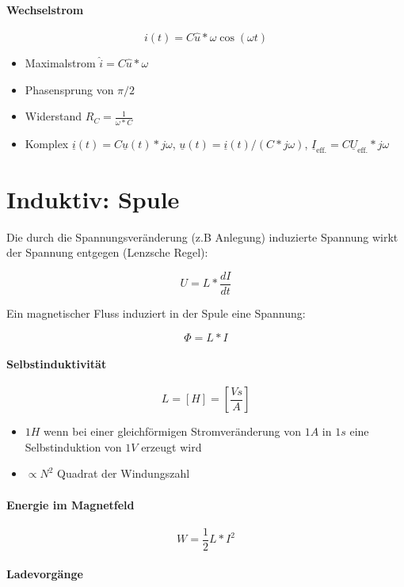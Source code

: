 \paragraph{Wechselstrom}

$$i(t) = C \hat{u} * \omega \cos (\omega t)$$

\begin{itemize}
  \item Maximalstrom $\hat{i} = C \hat{u} * \omega$
  \item Phasensprung von $\pi/2$
  \item Widerstand $R_C = \frac{1}{\omega * C}$
  \item Komplex $\underline{i}(t) = C \underline{u}(t) * j\omega$, $\underline{u}(t) = \underline{i}(t) / (C * j\omega)$, $\underline{I}_\text{eff.} = C \underline{U}_\text{eff.} * j\omega$
\end{itemize}

\section{Induktiv: Spule}

Die durch die Spannungsveränderung (z.B Anlegung) induzierte Spannung wirkt der Spannung entgegen (Lenzsche Regel):

$$U = L * \frac{dI}{dt}$$

Ein magnetischer Fluss induziert in der Spule eine Spannung:

$$\Phi = L * I$$

\paragraph{Selbstinduktivität}

$$L = [H] = \left[\frac{Vs}{A}\right]$$

\begin{itemize}
  \item $1H$ wenn bei einer gleichförmigen Stromveränderung von $1A$ in $1s$ eine Selbstinduktion von $1V$ erzeugt wird
  \item $\propto N^2$ Quadrat der Windungszahl
\end{itemize}

\paragraph{Energie im Magnetfeld}

$$W = \frac{1}{2} L * I^2$$

\paragraph{Ladevorgänge}

